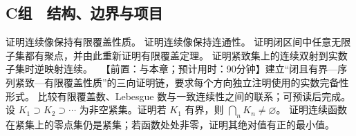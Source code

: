 \subsection*{C组　结构、边界与项目}
\begin{enumerate}[label=\textbf{18.\arabic*.},resume]
  \mustdo 证明连续像保持有限覆盖性质。
  \mustdo 证明连续像保持连通性。
  \optionaldo 证明闭区间中任意无限子集都有聚点，并由此重新证明有限覆盖定理。
  \optionaldo 证明紧致集上的连续双射到实数子集时逆映射连续。
  \projectdo\ 【前置：与本章；预计用时：90分钟】建立“闭且有界—序列紧致—有限覆盖性质”的三向证明链，要求每个方向独立注明使用的实数完备性形式。
  \opendo 比较有限覆盖数、Lebesgue 数与一致连续性之间的联系；可预读后完成。
  \mustdo 设 \(K_1\supset K_2\supset\cdots\) 为非空紧集。证明若 \(K_1\) 有界，则 \(\bigcap_nK_n\ne\varnothing\)。
  \optionaldo 证明连续函数在紧集上的零点集仍是紧集；若函数处处非零，证明其绝对值有正的最小值。
\end{enumerate}
